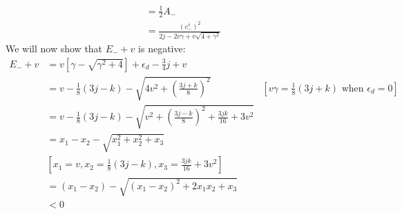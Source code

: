 \documentclass[12pt,twoside]{report}
\numberwithin{equation}{section}
\begin{document}
{\begin{equation}
\begin{aligned}
					 &= \frac{1}{2}A_-\\
					 &= \frac{\left( c^s_- \right)^2}{2j - 2v\gamma + v\sqrt{4 + \gamma^2}}
\end{aligned}\end{equation}
We will now show that \(E_- + v\) is negative:
\begin{equation}\begin{aligned}
	E_- + v &= v\left[ \gamma - \sqrt{\gamma^2 + 4} \right] + \epsilon_d - \frac{3}{4}j + v\\
		&= v - \frac{1}{8}\left( 3j-k \right) - \sqrt{4v^2 + \left( \frac{3j+k}{8} \right) ^2} &\left[v\gamma = \frac{1}{8}\left( 3j + k \right) \text{ when }\epsilon_d=0\right]\\
		&= v - \frac{1}{8}\left( 3j-k \right) - \sqrt{v^2 + \left( \frac{3j-k}{8} \right)^2 + \frac{3jk}{16} + 3v^2}\\
	&= x_1 - x_2 - \sqrt{x_1^2 + x_2^2 + x_3}\\
	&\left[x_1 = v, x_2 = \frac{1}{8}\left( 3j-k \right), x_3 = \frac{3jk}{16} + 3v^2\right]\\
		&= (x_1 - x_2) - \sqrt{\left(x_1 - x_2\right)^2 + 2x_1x_2 + x_3}\\
		&<0
\end{aligned}\end{equation}
}
\end{document}
